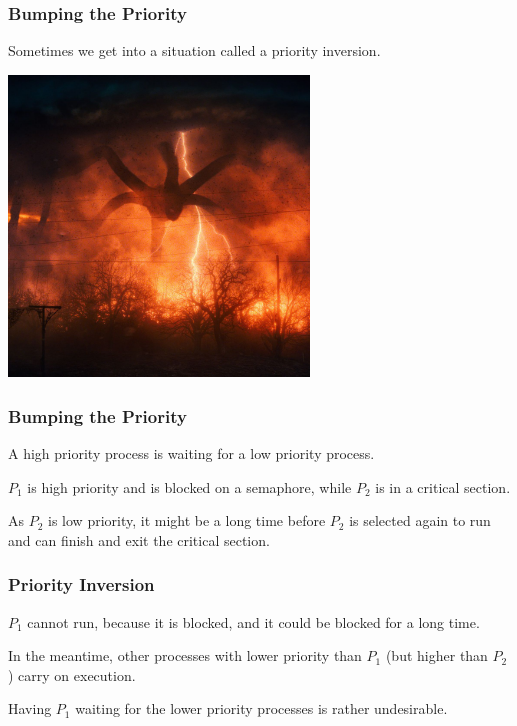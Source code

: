 \begin{frame}
\frametitle{Bumping the Priority}

Sometimes we get into a situation called a \alert{priority inversion}. 

\begin{center}
	\includegraphics[width=0.6\textwidth]{images/upsidedown.jpg}
\end{center}

\end{frame}

\begin{frame}
\frametitle{Bumping the Priority}


A high priority process is waiting for a low priority process. 

$P_{1}$ is high priority and is blocked on a semaphore, while $P_{2}$ is in a critical section. 

As $P_{2}$ is low priority, it might be a long time before $P_{2}$ is selected again to run and can finish and exit the critical section. 

\end{frame}

\begin{frame}
\frametitle{Priority Inversion}

$P_{1}$ cannot run, because it is blocked, and it could be blocked for a long time. 

In the meantime, other processes with lower priority than $P_{1}$ (but higher than $P_{2}$) carry on execution. 

Having $P_{1}$ waiting for the lower priority processes is rather undesirable.


\end{frame}

